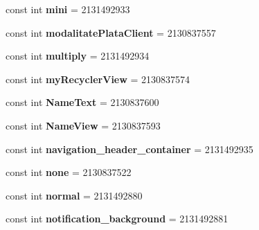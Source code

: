 \begin{DoxyCompactItemize}
const int {\bfseries mini} = 2131492933
\item 
\mbox{\label{classst_delivery_1_1_resource_1_1_id_ad8d6d2368d84bdf6d36de28789a8317a}} 
const int {\bfseries modalitate\+Plata\+Client} = 2130837557
\item 
\mbox{\label{classst_delivery_1_1_resource_1_1_id_aff84a35a1ba4b367400369c91444eec3}} 
const int {\bfseries multiply} = 2131492934
\item 
\mbox{\label{classst_delivery_1_1_resource_1_1_id_ac92dd8eded79ee4663c8167e2ff46d08}} 
const int {\bfseries my\+Recycler\+View} = 2130837574
\item 
\mbox{\label{classst_delivery_1_1_resource_1_1_id_ad9b6a91ec79353364ef5312ffd1a8f82}} 
const int {\bfseries Name\+Text} = 2130837600
\item 
\mbox{\label{classst_delivery_1_1_resource_1_1_id_a9711b34324fc2e163dfb209c666a67ea}} 
const int {\bfseries Name\+View} = 2130837593
\item 
\mbox{\label{classst_delivery_1_1_resource_1_1_id_a8d9eedb54377dc166d3e693fc5ff2b9a}} 
const int {\bfseries navigation\+\_\+header\+\_\+container} = 2131492935
\item 
\mbox{\label{classst_delivery_1_1_resource_1_1_id_ac98ce1899f99e1ec5c7bebc842fdebf0}} 
const int {\bfseries none} = 2130837522
\item 
\mbox{\label{classst_delivery_1_1_resource_1_1_id_ab1900c383cdf5ce154d0b6fef6640ac0}} 
const int {\bfseries normal} = 2131492880
\item 
\mbox{\label{classst_delivery_1_1_resource_1_1_id_a807a2764b30d2b67d65005642181aee5}} 
const int {\bfseries notification\+\_\+background} = 2131492881
\item 
\mbox{\label{classst_delivery_1_1_resource_1_1_id_a81228e1b53c4b62e5124551570830672}} 

\end{DoxyCompactItemize}
